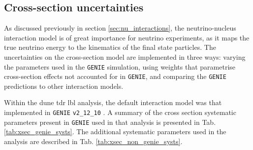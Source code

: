 \subsection{Cross-section uncertainties}

As discussed previously in section \ref{sec:nu_interactions}, the neutrino-nucleus interaction model is of great importance for neutrino experiments, as it maps the true neutrino energy to the kinematics of the final state particles. The uncertainties on the cross-section model are implemented in three ways: varying the parameters used in the \texttt{GENIE} simulation, using weights that parametrise cross-section effects not accounted for in \texttt{GENIE}, and comparing the \texttt{GENIE} predictions to other interaction models.

Within the \gls{dune} \gls{tdr} \gls{lbl} analysis, the default interaction model was that implemented in \texttt{GENIE} \texttt{v2_12_10} \cite{DUNE2021}. A summary of the cross section systematic parameters present in \texttt{GENIE} used in that analysis is presented in Tab. \ref{tab:xsec_genie_systs}. The additional systematic parameters used in the analysis are described in Tab. \ref{tab:xsec_non_genie_systs}.

